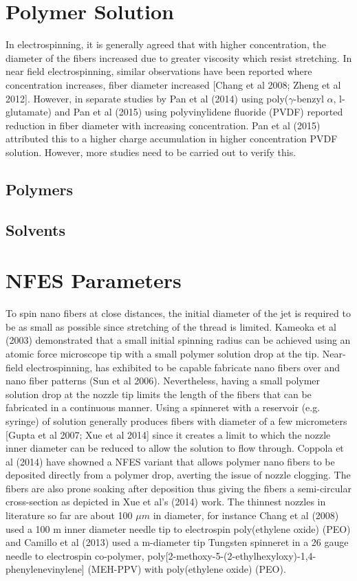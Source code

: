 \documentclass[3p,,preprint,12pt]{elsarticle}
\begin{document}
    
\section{Polymer Solution}
In electrospinning, it is generally agreed that with higher concentration, the diameter of the fibers increased due to greater viscosity which resist stretching. In near field electrospinning, similar observations have been reported where concentration increases, fiber diameter increased [Chang et al 2008; Zheng et al 2012]. However, in separate studies by Pan et al (2014) using poly(\ensuremath{\gamma }-benzyl \ensuremath{\alpha }, l-glutamate) and Pan et al (2015) using polyvinylidene fluoride (PVDF) reported reduction in fiber diameter with increasing concentration. Pan et al (2015) attributed this to a higher charge accumulation in higher concentration PVDF solution. However, more studies need to be carried out to verify this.



\subsection{Polymers}



\subsection{Solvents}
    
\section{NFES Parameters}
To spin nano fibers at close distances, the initial diameter of the jet is required to be as small as possible since stretching of the thread is limited. Kameoka et al (2003) demonstrated that a small initial spinning radius can be achieved using an atomic force microscope tip with a small polymer solution drop at the tip. Near-field electrospinning, has exhibited to be capable fabricate nano fibers over and nano fiber patterns (Sun et al 2006). Nevertheless, having a small polymer solution drop at the nozzle tip limits the length of the fibers that can be fabricated in a continuous manner. Using a spinneret with a reservoir (e.g. syringe) of solution generally produces fibers with diameter of a few micrometers [Gupta et al 2007; Xue et al 2014] since it creates a limit to which the nozzle inner diameter can be reduced to allow the solution to flow through. Coppola et al (2014) have showned a NFES variant that allows polymer nano fibers to be deposited directly from a polymer drop,  averting the issue of nozzle clogging. The fibers are also prone soaking after deposition thus giving the fibers a semi-circular cross-section as depicted in Xue et al's (2014) work. The thinnest nozzles in literature so far are about 100 $\mu m $ in diameter, for instance Chang et al (2008) used a 100 \textmu m inner diameter needle tip to electrospin poly(ethylene oxide) (PEO) and Camillo et al (2013) used a \textmu m-diameter tip Tungsten spinneret in a 26 gauge needle to electrospin co-polymer, poly[2-methoxy-5-(2-ethylhexyloxy)-1,4-phenylenevinylene] (MEH-PPV) with poly(ethylene oxide) (PEO).
\end{document}

